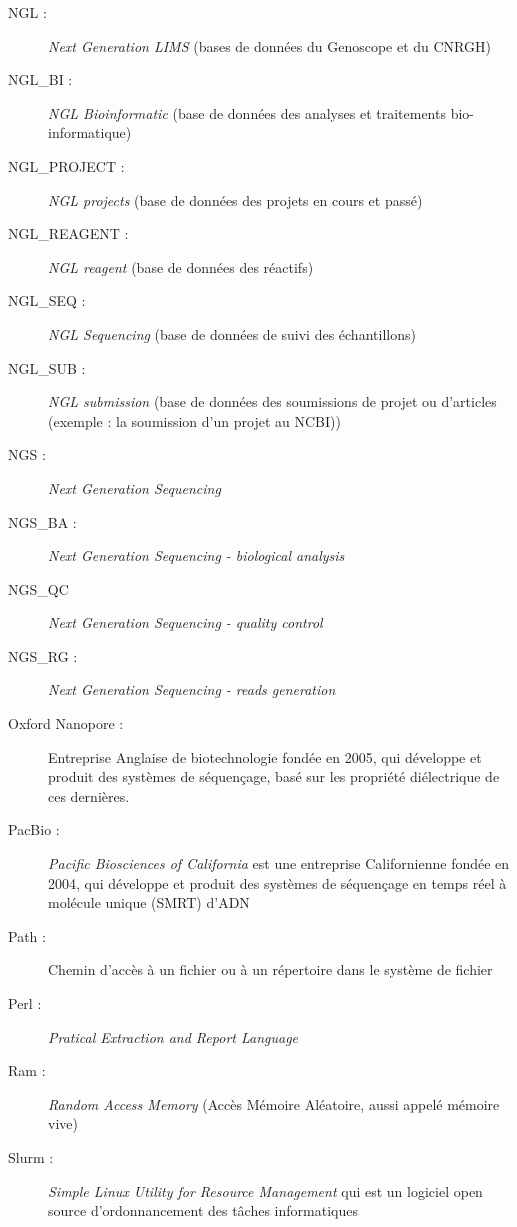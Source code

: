 \begin{description}
    \item[NGL :] \emph{Next Generation LIMS} (bases de données du Genoscope et du CNRGH)
    \item[NGL\_BI :] \emph{NGL Bioinformatic} (base de données des analyses et traitements bio-informatique)
    \item[NGL\_PROJECT :] \emph{NGL projects} (base de données des projets en cours et passé)
    \item[NGL\_REAGENT :] \emph{NGL reagent} (base de données des réactifs)
    \item[NGL\_SEQ :] \emph{NGL Sequencing} (base de données de suivi des échantillons)
    \item[NGL\_SUB :] \emph{NGL submission} (base de données des soumissions de projet ou d'articles (exemple : la soumission d'un projet au NCBI))
    \item[NGS :] \emph{Next Generation Sequencing}
    \item[NGS\_BA :] \emph{Next Generation Sequencing - biological analysis}
    \item[NGS\_QC] \emph{Next Generation Sequencing - quality control}
    \item[NGS\_RG : ] \emph{Next Generation Sequencing - reads generation}
    \item[Oxford Nanopore :] Entreprise Anglaise de biotechnologie fondée en 2005, qui développe et produit des systèmes de séquençage, basé sur les propriété diélectrique de ces dernières.
    \item[PacBio :] \emph{Pacific Biosciences of California} est une entreprise Californienne fondée en 2004, qui développe et produit des systèmes de séquençage en temps réel à molécule unique (SMRT) d'ADN
    \item[Path : ] Chemin d'accès à un fichier ou à un répertoire dans le système de fichier
    \item[Perl :] \emph{Pratical Extraction and Report Language}
    \item[Ram :] \emph{Random Access Memory} (Accès Mémoire Aléatoire, aussi appelé mémoire vive)
    \item[Slurm :] \emph{Simple Linux Utility for Resource Management} qui est un logiciel open source d'ordonnancement des tâches informatiques
\end{description}
